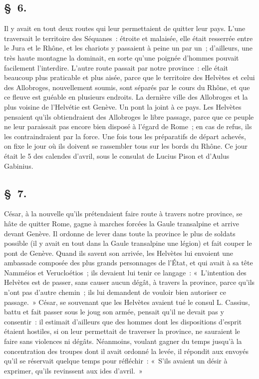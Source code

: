 \documentclass[french,twoside]{book} %
\begin{document}
\subsection[{§ 6.}]{ \textsc{§ 6.} }
\noindent Il y avait en tout deux routes qui leur permettaient de quitter leur pays. L'une traversait le territoire des Séquanes : étroite et malaisée, elle était resserrée entre le Jura et le Rhône, et les chariots y passaient à peine un par un ; d’ailleurs, une très haute montagne la dominait, en sorte qu’une poignée d’hommes pouvait facilement l’interdire. L'autre route passait par notre province : elle était beaucoup plus praticable et plus aisée, parce que le territoire des Helvètes et celui des Allobroges, nouvellement soumis, sont séparés par le cours du Rhône, et que ce fleuve est guéable en plusieurs endroits. La dernière ville des Allobroges et la plus voisine de l’Helvétie est Genève. Un pont la joint à ce pays. Les Helvètes pensaient qu’ils obtiendraient des Allobroges le libre passage, parce que ce peuple ne leur paraissait pas encore bien disposé à l’égard de Rome ; en cas de refus, ils les contraindraient par la force. Une fois tous les préparatifs de départ achevés, on fixe le jour où ils doivent se rassembler tous sur les bords du Rhône. Ce jour était le 5 des calendes d’avril, sous le consulat de Lucius Pison et d’Aulus Gabinius.
\subsection[{§ 7.}]{ \textsc{§ 7.} }
\noindent César, à la nouvelle qu’ils prétendaient faire route à travers notre province, se hâte de quitter Rome, gagne à marches forcées la Gaule transalpine et arrive devant Genève. Il ordonne de lever dans toute la province le plus de soldats possible (il y avait en tout dans la Gaule transalpine une légion) et fait couper le pont de Genève. Quand ils savent son arrivée, les Helvètes lui envoient une ambassade composée des plus grands personnages de l’État, et qui avait à sa tête Namméios et Verucloétios ; ils devaient lui tenir ce langage : « L'intention des Helvètes est de passer, sans causer aucun dégât, à travers la province, parce qu’ils n’ont pas d’autre chemin ; ils lui demandent de vouloir bien autoriser ce passage. » César, se souvenant que les Helvètes avaient tué le consul L. Cassius, battu et fait passer sous le joug son armée, pensait qu’il ne devait pas y consentir : il estimait d’ailleurs que des hommes dont les dispositions d’esprit étaient hostiles, si on leur permettait de traverser la province, ne sauraient le faire sans violences ni dégâts. Néanmoins, voulant gagner du temps jusqu’à la concentration des troupes dont il avait ordonné la levée, il répondit aux envoyés qu’il se réservait quelque temps pour réfléchir : « S'ils avaient un désir à exprimer, qu’ils revinssent aux ides d’avril. »
\end{document}
